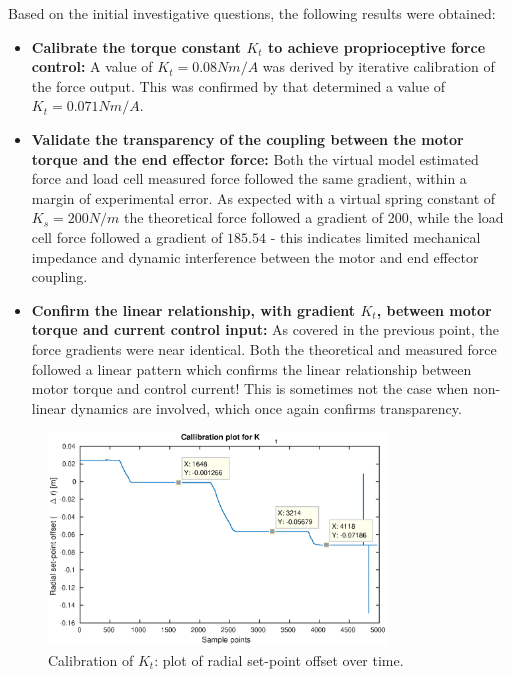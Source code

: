 Based on the initial investigative questions, the following results were obtained:
\begin{itemize}
\item \textbf{Calibrate the torque constant $K_t$ to achieve proprioceptive force control:} A value of $K_t = 0.08 Nm/A$ was derived by iterative calibration of the force output. This was confirmed by \cite{Kalouche2016} that determined a value of $K_t = 0.071 Nm/A$.
\item \textbf{Validate the transparency of the coupling between the motor torque and the end effector force:} Both the virtual model estimated force and load cell measured force followed the same gradient, within a margin of experimental error. As expected with a virtual spring constant of $K_s = 200 N/m$ the theoretical force followed a gradient of 200, while the load cell force followed a gradient of $185.54$ - this indicates limited mechanical impedance and dynamic interference between the motor and end effector coupling.
\item \textbf{Confirm the linear relationship, with gradient $K_t$, between motor torque and current control input:} As covered in the previous point, the force gradients were near identical. Both the theoretical and measured force followed a linear pattern which confirms the linear relationship between motor torque and control current! This is sometimes not the case when non-linear dynamics are involved, which once again confirms transparency.
\end{itemize}

\begin{figure}
\centering
\includegraphics[width=0.8\textwidth]{images/experiments/kt-callibration.eps} 
\caption{Calibration of $K_t$: plot of radial set-point offset over time.}
\label{fig:kt-callibration}
\end{figure}

